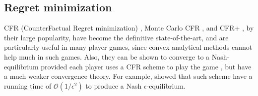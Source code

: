 \documentclass[a4paper,9pt]{extarticle}
\begin{document}
\subsection{Regret minimization}
CFR (CounterFactual Regret minimization) \cite{zinkevich2008regret},
Monte Carlo CFR \cite{lanctot2009monte}, and CFR+
\cite{Bowling09012015}, by their large popularity, have become the
definitive state-of-the-art, and are particularly useful in
many-player games, since convex-analytical methods cannot help much in
such games. Also, they can be shown to converge to a Nash-equilibrium
provided each player uses a CFR scheme to play the game
\cite{zinkevich2008regret}, but have a much weaker
convergence theory. For example, \cite{lanctot2009monte} showed that
such scheme have a running time of $\mathcal{O}(1/\epsilon^2)$ to
produce a Nash $\epsilon$-equilibrium.
\end{document}
